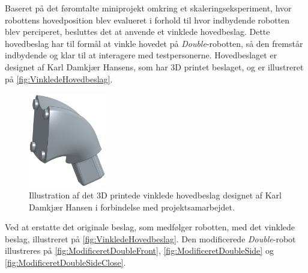 Baseret på det føromtalte miniprojekt omkring et skaleringseksperiment, hvor robottens hovedposition blev evalueret i forhold til hvor indbydende robotten blev perciperet, besluttes det at anvende et vinklede hovedbeslag. Dette hovedbeslag har til formål at vinkle hovedet på \textit{Double}-robotten, så den fremstår indbydende og klar til at interagere med testpersonerne. Hovedbeslaget er designet af Karl Damkjær Hansens, som har 3D printet beslaget, og er illustreret på \autoref{fig:VinkledeHovedbeslag}.            
%
\begin{figure}[H]
\centering
\includegraphics[width = 0.3\textwidth]{Figure/VinkledeHovedbeslag} 
\caption{Illustration af det 3D printede vinklede hovedbeslag designet af Karl Damkjær Hansen i forbindelse med projektsamarbejdet.}
\label{fig:VinkledeHovedbeslag}
\end{figure}
\noindent
%
Ved at erstatte det originale beslag, som medfølger robotten, med det vinklede beslag, illustreret på \autoref{fig:VinkledeHovedbeslag}. Den modificerede \textit{Double}-robot illustreres på \autoref{fig:ModificeretDoubleFront}, \autoref{fig:ModificeretDoubleSide} og \autoref{fig:ModificeretDoubleSideClose}.
%
